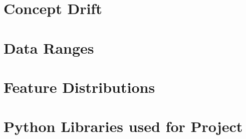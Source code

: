 \documentclass[bsc,frontabs,twoside,singlespacing,parskip,deptreport]{infthesis}     %
\begin{document}
\begin{appendices}

\chapter{Concept Drift}


\chapter{Data Ranges}


\chapter{Feature Distributions}


% 

% 

% 

% 


\chapter{Python Libraries used for Project}


\end{appendices}




\end{document}
